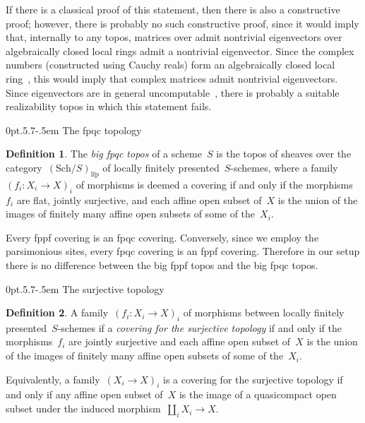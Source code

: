 \documentclass[10pt,reqno,a4paper]{amsbook}
\makeatletter
\theoremstyle{definition}
\newtheorem{defn}{Definition}[section]
\theoremstyle{plain}
\theoremstyle{remark}
\newcommand{\Sch}{\mathrm{Sch}}
\newcommand{\lfp}{\mathrm{lfp}}
\newcommand{\?}{\,{:}\,}
\renewcommand{\_}{\mathpunct{.}\,}
\def\subsection{\@startsection{subsection}{2}%
  {0pt}{.5\linespacing\@plus.7\linespacing}{-.5em}%
  {\normalfont\bfseries}}
\makeatother
\begin{document}
\begin{itemize}
If there is a classical proof of this statement, then there is also a
constructive proof; however, there is probably no such constructive proof,
since it would imply that, internally to any topos, matrices over admit
nontrivial eigenvectors over algebraically closed local rings admit a
nontrivial eigenvector. Since the complex numbers (constructed using Cauchy
reals) form an algebraically closed local
ring~\cite[Theorem~3.13]{ruitenburg:roots}, this would imply that complex
matrices admit nontrivial eigenvectors. Since eigenvectors are in general
uncomputable~\cite[Proposition~12]{ziegler:brattka:spectrum}, there is probably
a suitable realizability topos in which this statement fails.
\end{itemize}


\subsection{The fpqc topology}

\begin{defn}The \emph{big fpqc topos} of a scheme~$S$ is the topos of sheaves
over the category~$(\Sch/S)_\lfp$ of locally finitely presented~$S$-schemes, where a
family~$(f_i : X_i \to X)_i$ of morphisms is deemed a covering if and only if
the morphisms~$f_i$ are flat, jointly surjective, and each affine open subset
of~$X$ is the union of the images of finitely many affine open subsets of some of
the~$X_i$.
\end{defn}

Every fppf covering is an fpqc covering. Conversely, since we employ the
parsimonious sites, every fpqc covering is an fppf covering. Therefore in our
setup there is no difference between the big fppf topos and the big fpqc topos.


\subsection{The surjective topology}

\begin{defn}A family~$(f_i : X_i \to X)_i$ of morphisms between locally finitely
presented~$S$-schemes if a \emph{covering for the surjective topology} if and
only if the morphisms~$f_i$ are jointly surjective and each affine open subset 
of~$X$ is the union of the images of finitely many affine open subsets of some of
the~$X_i$.
\end{defn}

Equivalently, a family~$(X_i \to X)_i$ is a covering for the surjective
topology if and only if any affine open subset of~$X$ is the image of a
quasicompact open subset under the induced morphism~$\coprod_i X_i \to X$.
\end{document}
